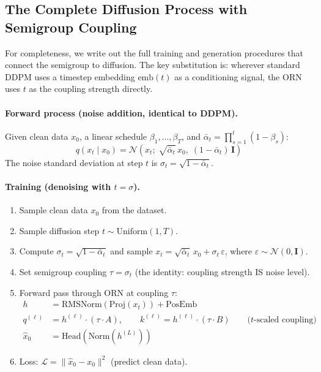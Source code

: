 \documentclass[11pt, a4paper]{article}
\theoremstyle{plain}
\theoremstyle{remark}
\begin{document}
\subsection{The Complete Diffusion Process with Semigroup Coupling}

For completeness, we write out the full training and generation procedures that connect the semigroup to diffusion.
The key substitution is: wherever standard DDPM uses a timestep embedding $\text{emb}(t)$ as a conditioning signal, the ORN uses $t$ as the coupling strength directly.

\paragraph{Forward process (noise addition, identical to DDPM).}
Given clean data $x_0$, a linear schedule $\beta_1, \ldots, \beta_T$, and $\bar{\alpha}_t = \prod_{s=1}^{t}(1-\beta_s)$:
\[
    q(x_t \mid x_0) = \mathcal{N}\!\left(x_t;\; \sqrt{\bar{\alpha}_t}\, x_0,\; (1-\bar{\alpha}_t)\,\mathbf{I}\right)
\]
The noise standard deviation at step $t$ is $\sigma_t = \sqrt{1 - \bar{\alpha}_t}$.

\paragraph{Training (denoising with $t = \sigma$).}
\begin{enumerate}[nosep]
    \item Sample clean data $x_0$ from the dataset.
    \item Sample diffusion step $t \sim \text{Uniform}(1, T)$.
    \item Compute $\sigma_t = \sqrt{1 - \bar{\alpha}_t}$ and sample $x_t = \sqrt{\bar{\alpha}_t}\,x_0 + \sigma_t\,\varepsilon$, where $\varepsilon \sim \mathcal{N}(0, \mathbf{I})$.
    \item Set semigroup coupling $\tau = \sigma_t$ \quad (the identity: coupling strength IS noise level).
    \item Forward pass through ORN at coupling $\tau$:
    \begin{align*}
        h &= \text{RMSNorm}(\text{Proj}(x_t)) + \text{PosEmb} \\
        q^{(\ell)} &= h^{(\ell)} \cdot (\tau \cdot A), \qquad k^{(\ell)} = h^{(\ell)} \cdot (\tau \cdot B) \qquad \text{(}t\text{-scaled coupling)} \\
        \hat{x}_0 &= \text{Head}(\text{Norm}(h^{(L)}))
    \end{align*}
    \item Loss: $\mathcal{L} = \|  \hat{x}_0 - x_0 \|^2$ \quad (predict clean data).
\end{enumerate}
\end{document}
